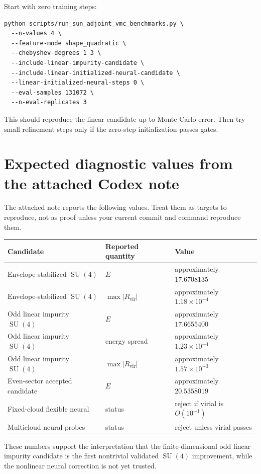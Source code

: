 \documentclass[11pt]{article}
\newcommand{\Rvir}{R_{\mathrm{vir}}}
\newcommand{\SU}{\operatorname{SU}}
\begin{document}
Start with zero training steps:

\begin{lstlisting}[style=bashstyle]
python scripts/run_sun_adjoint_vmc_benchmarks.py \
  --n-values 4 \
  --feature-mode shape_quadratic \
  --chebyshev-degrees 1 3 \
  --include-linear-impurity-candidate \
  --include-linear-initialized-neural-candidate \
  --linear-initialized-neural-steps 0 \
  --eval-samples 131072 \
  --n-eval-replicates 3
\end{lstlisting}

This should reproduce the linear candidate up to Monte Carlo error. Then try small refinement steps only if the zero-step initialization passes gates.

\section{Expected diagnostic values from the attached Codex note}

The attached note reports the following values. Treat them as targets to reproduce, not as proof unless your current commit and command reproduce them.

\begin{center}
\begin{tabular}{lll}
\toprule
Candidate & Reported quantity & Value \\
\midrule
Envelope-stabilized \(\SU(4)\) & \(E\) & approximately \(17.6708135\) \\
Envelope-stabilized \(\SU(4)\) & \(\max|\Rvir|\) & approximately \(1.18\times10^{-4}\) \\
Odd linear impurity \(\SU(4)\) & \(E\) & approximately \(17.6655400\) \\
Odd linear impurity \(\SU(4)\) & energy spread & approximately \(1.23\times10^{-4}\) \\
Odd linear impurity \(\SU(4)\) & \(\max|\Rvir|\) & approximately \(1.57\times10^{-3}\) \\
Even-sector accepted candidate & \(E\) & approximately \(20.5358019\) \\
Fixed-cloud flexible neural & status & reject if virial is \(O(10^{-1})\) \\
Multicloud neural probes & status & reject unless virial passes \\
\bottomrule
\end{tabular}
\end{center}

These numbers support the interpretation that the finite-dimensional odd linear impurity candidate is the first nontrivial validated \(\SU(4)\) improvement, while the nonlinear neural correction is not yet trusted.
\end{document}
